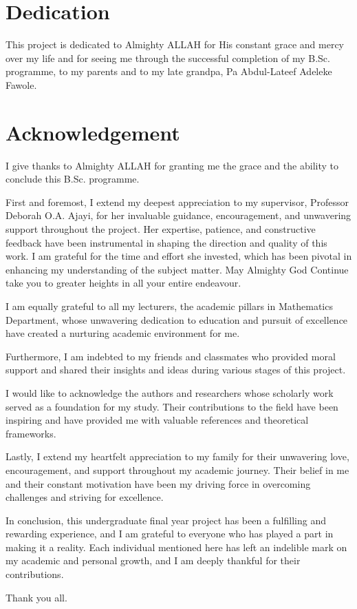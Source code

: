 \documentclass[
    a4paper,%
    12pt,%
    oneside, %
    openany, %
]{report}
\begin{document}
\chapter*{Dedication}
This project is dedicated to Almighty ALLAH for His constant grace and mercy over my life and for seeing me through the successful completion of my B.Sc. programme, to my parents and to my late grandpa, Pa Abdul-Lateef Adeleke Fawole.


\chapter*{Acknowledgement}
I give thanks to Almighty ALLAH for granting me the grace and the ability to conclude this B.Sc. programme.

First and foremost, I extend my deepest appreciation to my supervisor, Professor Deborah O.A. Ajayi, for her invaluable guidance, encouragement, and unwavering support throughout the project. Her expertise, patience, and constructive feedback have been instrumental in shaping the direction and quality of this work. I am grateful for the time and effort she invested, which has been pivotal in enhancing my understanding of the subject matter. May Almighty God Continue take you to greater heights in all your entire endeavour. 

I am equally grateful to all my lecturers, the academic pillars in Mathematics Department, whose unwavering dedication to education and pursuit of excellence have created a nurturing academic environment for me.

Furthermore, I am indebted to my friends and classmates who provided moral support and shared their insights and ideas during various stages of this project.

I would like to acknowledge the authors and researchers whose scholarly work served as a foundation for my study. Their contributions to the field have been inspiring and have provided me with valuable references and theoretical frameworks.

Lastly, I extend my heartfelt appreciation to my family for their unwavering love, encouragement, and support throughout my academic journey. Their belief in me and their constant motivation have been my driving force in overcoming challenges and striving for excellence.

In conclusion, this undergraduate final year project has been a fulfilling and rewarding experience, and I am grateful to everyone who has played a part in making it a reality. Each individual mentioned here has left an indelible mark on my academic and personal growth, and I am deeply thankful for their contributions.

Thank you all.



\newpage



{}
\tableofcontents
\listoffigures
\newpage
{}







\end{document}
